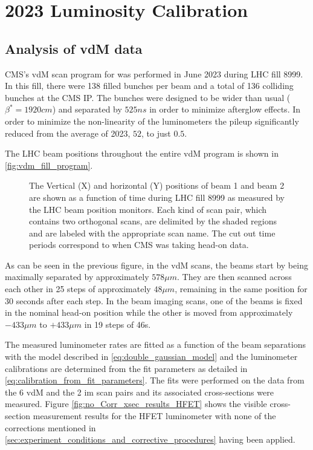 \chapter{2023 Luminosity Calibration}
\label{ch:2023_luminosity_calibration}

\section{Analysis of vdM data}

CMS's vdM scan program for was performed in June 2023 during LHC fill 8999. In this fill, there were 138 filled bunches per beam and a total of 136 colliding bunches at the CMS IP. The bunches were designed to be wider than usual ($\beta^{*} = 1920 cm$) and separated by $525 ns$ in order to minimize afterglow effects. In order to minimize the non-linearity of the luminometers the pileup significantly reduced from the average of 2023, $52$, to just $0.5$.

The LHC beam positions throughout the entire vdM program is shown in \autoref{fig:vdm_fill_program}.

\begin{figure}[!htb]
	\centering
	\caption[Beam positions during fill 8999]{The Vertical (X) and horizontal (Y) positions of beam 1 and beam 2 are shown as a function of time during LHC fill 8999 as measured by the LHC beam position monitors. Each kind of scan pair, which contains two orthogonal scans, are delimited by the shaded regions and are labeled with the appropriate scan name. The cut out time periods correspond to when CMS was taking head-on data.}
	\label{fig:vdm_fill_program}
\end{figure}

As can be seen in the previous figure, in the vdM scans, the beams start by being maximally separated by approximately $578 \mu m$. They are then scanned across each other in 25 steps of approximately $48 \mu m$, remaining in the same position for 30 seconds after each step. In the beam imaging scans, one of the beams is fixed in the nominal head-on position while the other is moved from approximately $-433 \mu m$ to $+433 \mu m$ in 19 steps of 46s.

The measured luminometer rates are fitted as a function of the beam separations with the model described in \autoref{eq:double_gaussian_model} and the luminometer calibrations are determined from the fit parameters as detailed in \autoref{eq:calibration_from_fit_parameters}. The fits were performed on the data from the 6 vdM and the 2 im scan pairs and its associated cross-sections were measured. Figure \autoref{fig:no_Corr_xsec_results_HFET} shows the visible cross-section measurement results for the HFET luminometer with none of the corrections mentioned in \autoref{sec:experiment_conditions_and_corrective_procedures} having been applied.

